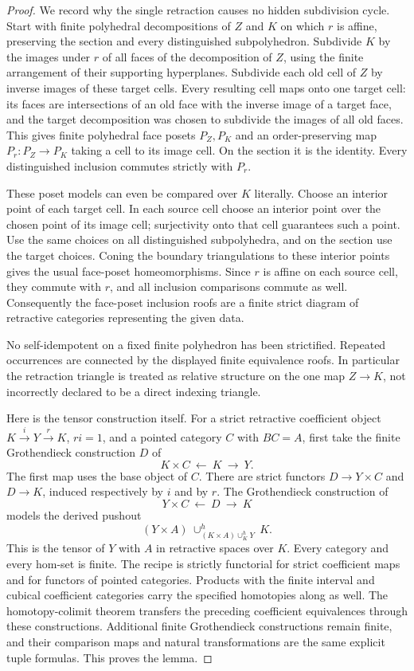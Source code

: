 \begin{proof}
We record why the single retraction causes no hidden subdivision
cycle.  Start with finite polyhedral decompositions of $Z$ and $K$
on which $r$ is affine, preserving the section and every distinguished
subpolyhedron.  Subdivide $K$ by the images under $r$ of all faces of
the decomposition of $Z$, using the finite arrangement of their
supporting hyperplanes.  Subdivide each old cell of $Z$ by inverse
images of these target cells.  Every resulting cell maps onto one
target cell: its faces are intersections of an old face with the
inverse image of a target face, and the target decomposition was
chosen to subdivide the images of all old faces.  This gives finite
polyhedral face posets $P_Z,P_K$ and an order-preserving map
$P_r:P_Z\to P_K$ taking a cell to its image cell.  On the section
it is the identity.  Every distinguished inclusion commutes strictly
with $P_r$.

These poset models can even be compared over $K$ literally.  Choose
an interior point of each target cell.  In each source cell choose an
interior point over the chosen point of its image cell; surjectivity
onto that cell guarantees such a point.  Use the same choices on all
distinguished subpolyhedra, and on the section use the target choices.
Coning the boundary triangulations to these interior points gives the
usual face-poset homeomorphisms.  Since $r$ is affine on each source
cell, they commute with $r$, and all inclusion comparisons commute
as well.  Consequently the face-poset inclusion roofs are a finite
strict diagram of retractive categories representing the given data.

No self-idempotent on a fixed finite polyhedron has been strictified.
Repeated occurrences are connected by the displayed finite equivalence
roofs.  In particular the retraction triangle is treated as relative
structure on the one map $Z\to K$, not incorrectly declared to be a
direct indexing triangle.

Here is the tensor construction itself.  For a strict retractive
coefficient object $K\xrightarrow{i}Y\xrightarrow{r}K$, $ri=1$,
and a pointed category $C$ with $BC=A$, first take the finite
Grothendieck construction $D$ of
\[
 K\times C\ \longleftarrow\ K\ \longrightarrow\ Y.
\]
The first map uses the base object of $C$.  There are strict functors
$D\to Y\times C$ and $D\to K$, induced respectively by $i$ and
by $r$.  The Grothendieck construction of
\[
 Y\times C\ \longleftarrow\ D\ \longrightarrow\ K
\]
models the derived pushout
\[
 (Y\times A)\ \cup^h_{(K\times A)\cup^h_K Y}\ K.
\]
This is the tensor of $Y$ with $A$ in retractive spaces over $K$.
Every category and every hom-set is finite.  The recipe is strictly
functorial for strict coefficient maps and for functors of pointed
categories.  Products with the finite interval and cubical
coefficient categories carry the specified homotopies along as
well.  The homotopy-colimit theorem transfers the preceding
coefficient equivalences through these constructions.  Additional
finite Grothendieck constructions remain finite, and their
comparison maps and natural transformations are the same
explicit tuple formulas.  This proves the lemma.
\end{proof}

